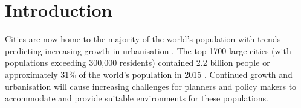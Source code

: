 \documentclass[10pt,letterpaper]{article}
\begin{document}



\linenumbers


\section*{Introduction}\label{sec:introduction}

Cities are now home to the majority of the world's population with trends predicting increasing growth in urbanisation \cite{UNDESA2015,WHO2016,ABS2008}. The top 1700 large cities (with populations exceeding 300,000 residents) contained 2.2 billion people or approximately 31\% of the world's population in 2015 \cite{UN2014}. Continued growth and urbanisation will cause increasing challenges for planners and policy makers to accommodate and provide suitable environments for these populations.
\end{document}
